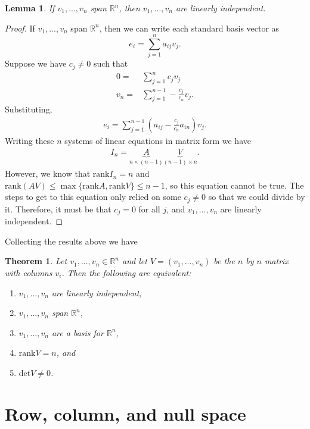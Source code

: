 \documentclass[12pt,reqno]{amsart}
\newtheorem{theorem}{Theorem}[section]
\newtheorem{lemma}{Lemma}[section]
\theoremstyle{definition}
\def\R{\mathbb{R}}
\renewcommand{\det}{\mathrm{det}}
\newcommand{\rank}{\mathrm{rank}}
\begin{document}
\begin{lemma}
  If $v_1, ..., v_n$ span $\R^n$, then $v_1, ... , v_n$ are linearly
  independent. 
\end{lemma}
\begin{proof}
  If $v_1, ..., v_n$ span $\R^n$, then we can write each standard
  basis vector as
  \[ e_i = \sum_{j=1}^n a_{ij} v_j. \]
  Suppose we have $c_j \neq 0$ such that
  \begin{align*} 
    0 = & \sum_{j=1}^n c_j v_j \\
    v_n = & \sum_{j=1}^{n-1} -\frac{c_j}{c_n} v_j.
  \end{align*}
  Substituting,
  \begin{align*}
    e_i = \sum_{j=1}^{n-1} (a_{ij} - \frac{c_j}{c_n} a_{in} ) v_j.
  \end{align*}
  Writing these $n$ systems of linear equations in matrix form we have
  \begin{align*}
    I_n = \underbrace{A}_{n\times(n-1)} \underbrace{V}_{(n-1) \times n}.
  \end{align*}
  However, we know that $\rank I_n = n$ and $\rank (A V) \leq
  \max\{\rank A, \rank V\} \leq n-1$, so this equation cannot be
  true. The steps to get to this equation only relied on some $c_j
  \neq 0$ so that we could divide by it. Therefore, it must be that
  $c_j = 0$ for all $j$, and $v_1,...,v_n$ are linearly independent.
\end{proof}

Collecting the results above we have
\begin{theorem}\label{thm:lind}
  Let $v_1, ..., v_n \in \R^n$ and let $V = (v_1,...,v_n)$ be the $n$
  by $n$ matrix with columns $v_i$. Then the following are equivalent:
  \begin{enumerate}
  \item $v_1,...,v_n$ are linearly independent,
  \item $v_1,...,v_n$ span $\R^n$,
  \item $v_1,...,v_n$ are a basis for $\R^n$,
  \item $\rank V = n$, and
  \item $\det V \neq 0$.
  \end{enumerate}
\end{theorem}

\section{Row, column, and null space}
\end{document}
